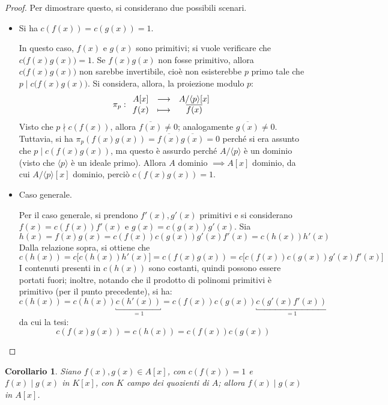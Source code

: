 \documentclass[11pt]{article}
\theoremstyle{style}
\newtheorem{corollario}{Corollario}[teorema]
\numberwithin{equation}{subsection}
\begin{document}
	\begin{proof}
		Per dimostrare questo, si considerano due possibili scenari.
		\begin{itemize}
			\item Si ha $c(f(x))=c(g(x)) = 1$.

				In questo caso, $f(x) $ e $g(x)$ sono primitivi; si vuole verificare che $c\big(f(x) g(x)\big) = 1$.
				Se $f(x) g(x)$ non fosse primitivo, allora $c\big(f(x)g(x)\big)$ non sarebbe invertibile, cio\`e non esisterebbe $p$ primo tale che $p  \mid c\big(f(x)g(x)\big)$.
				Si considera, allora, la proiezione modulo $p$:
				\[
				\pi_{p} :
				\begin{array}
					{c c c}
					A[x] &\longrightarrow & A / \langle p \rangle [x] \\
					f(x) &\longmapsto & \overline{f(x)}
				\end{array}
				\] 
				Visto che $p \nmid c(f(x))$, allora $\overline{f(x)}\neq 0$; analogamente $\overline{g(x)}\neq 0$.
				Tuttavia, si ha $\pi_p (f(x)g(x)) = \overline{f(x)}\overline{g(x)} = 0$ perch\'e si era assunto che $p \mid c(f(x)g(x))$, ma questo \`e assurdo perch\'e $A / \langle p \rangle$ \`e un dominio (visto che $\langle p \rangle$ \`e un ideale primo).
				Allora $A$ dominio $\implies A[x]$ dominio, da cui $A / \langle p \rangle [x]$ dominio, perci\`o $c(f(x)g(x)) = 1$.
			\item Caso generale.
				
				Per il caso generale, si prendono $f'(x),g'(x)$ primitivi e si considerano $f(x) = c(f(x)) f'(x)$ e $g(x) = c(g(x)) g'(x)$.
				Sia
				\[
				h(x) = f(x)g(x) = c(f(x)) c(g(x)) g'(x) f'(x)=c(h(x)) h'(x)
				\] 
Dalla relazione sopra, si ottiene che
\[
	c(h(x))=c\big[c(h(x)) h'(x)\big]= c(f(x)g(x))=c\big[c(f(x)) c(g(x)) g'(x) f'(x)\big]
\] 
I contenuti presenti in $c(h(x))$ sono costanti, quindi possono essere portati fuori; inoltre, notando che il prodotto di polinomi primitivi \`e primitivo (per il punto precedente), si ha:
\[
	c(h(x)) = c(h(x)) \underbracket{c(h'(x))}_{=1} =c(f(x))c(g(x)) \underbracket{c(g'(x)f'(x))}_{=1} 
\] 
 da cui la tesi:
 \[
 c(f(x)g(x)) = c(h(x)) = c(f(x))c(g(x))
 \] 
		\end{itemize}
	\end{proof}
\begin{corollario}\label{corufd1}
	Siano $f(x),g(x) \in A[x]$, con $c(f(x)) =1 $ e $f(x)  \mid g(x)$ in $K[x]$, con $K$ campo dei quozienti di $A$; allora $f(x)  \mid g(x)$ in $A[x]$.
\end{corollario}
\end{document}
